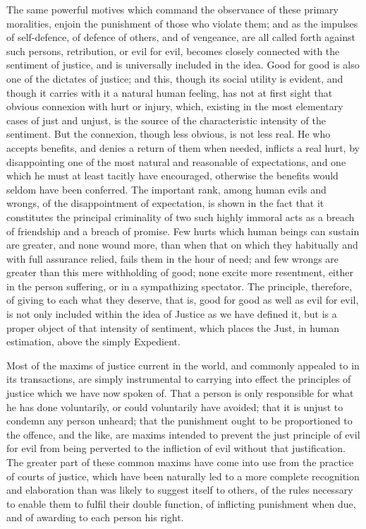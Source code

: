 \documentclass[12pt]{report}
\begin{document}
The same powerful motives which command the observance of these primary moralities, enjoin the punishment of those who violate them; and as the impulses of self-defence, of defence of others, and of vengeance, are all called forth against such persons, retribution, or evil for evil, becomes closely connected with the sentiment of justice, and is universally included in the idea. Good for good is also one of the dictates of justice; and this, though its social utility is evident, and though it carries with it a natural human feeling, has not at first sight that obvious connexion with hurt or injury, which, existing in the most elementary cases of just and unjust, is the source of the characteristic intensity of the sentiment. But the connexion, though less obvious, is not less real. He who accepts benefits, and denies a return of them when needed, inflicts a real hurt, by disappointing one of the most natural and reasonable of expectations, and one which he must at least tacitly have encouraged, otherwise the benefits would seldom have been conferred. The important rank, among human evils and wrongs, of the disappointment of expectation, is shown in the fact that it constitutes the principal criminality of two such highly immoral acts as a breach of friendship and a breach of promise. Few hurts which human beings can sustain are greater, and none wound more, than when that on which they habitually and with full assurance relied, fails them in the hour of need; and few wrongs are greater than this mere withholding of good; none excite more resentment, either in the person suffering, or in a sympathizing spectator. The principle, therefore, of giving to each what they deserve, that is, good for good as well as evil for evil, is not only included within the idea of Justice as we have defined it, but is a proper object of that intensity of sentiment, which places the Just, in human estimation, above the simply Expedient.

Most of the maxims of justice current in the world, and commonly appealed to in its transactions, are simply instrumental to carrying into effect the principles of justice which we have now spoken of. That a person is only responsible for what he has done voluntarily, or could voluntarily have avoided; that it is unjust to condemn any person unheard; that the punishment ought to be proportioned to the offence, and the like, are maxims intended to prevent the just principle of evil for evil from being perverted to the infliction of evil without that justification. The greater part of these common maxims have come into use from the practice of courts of justice, which have been naturally led to a more complete recognition and elaboration than was likely to suggest itself to others, of the rules necessary to enable them to fulfil their double function, of inflicting punishment when due, and of awarding to each person his right.
\end{document}
